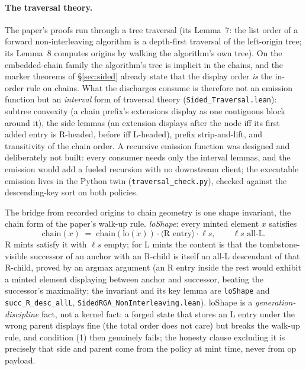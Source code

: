 \documentclass[11pt]{article}
\newcommand{\lean}[1]{\texttt{#1}}
\newcommand{\code}[1]{\texttt{#1}}
\newcommand{\chain}{\mathrm{chain}}
\begin{document}
\paragraph{The traversal theory.} The paper's proofs run through a
tree traversal (its Lemma~7: the list order of a forward
non-interleaving algorithm is a depth-first traversal of the
left-origin tree; its Lemma~8 computes origins by walking the
algorithm's own tree). On the embedded-chain family the algorithm's
tree is implicit in the chains, and the marker theorems of
\S\ref{sec:sided} already state that the display order \emph{is} the
in-order rule on chains. What the discharges consume is therefore not
an emission function but an \emph{interval} form of traversal theory
(\code{Sided\_Traversal.lean}): subtree convexity (a chain prefix's
extensions display as one contiguous block around it), the side lemmas
(an extension displays after the node iff its first added entry is
R-headed, before iff L-headed), prefix strip-and-lift, and transitivity
of the chain order. A recursive emission function was designed and
deliberately not built: every consumer needs only the interval lemmas,
and the emission would add a fueled recursion with no downstream
client; the executable emission lives in the Python twin
(\code{traversal\_check.py}), checked against the descending-key sort
on both policies.

The bridge from recorded origins to chain geometry is one shape
invariant, the chain form of the paper's walk-up rule.
\emph{loShape}: every minted element $x$ satisfies
\[
  \chain(x) \;=\; \chain(\mathrm{lo}(x)) \cdot \langle \text{R
  entry}\rangle \cdot \ell s, \qquad \ell s \text{ all-L}.
\]
R mints satisfy it with $\ell s$ empty; for L mints the content is that
the tombstone-visible successor of an anchor with an R-child is itself
an all-L descendant of that R-child, proved by an argmax argument (an R
entry inside the rest would exhibit a minted element displaying between
anchor and successor, beating the successor's maximality; the invariant
and its key lemma are \lean{loShape} and \lean{succ\_R\_desc\_allL},
\code{SidedRGA\_NonInterleaving.lean}). loShape is a
\emph{generation-discipline} fact, not a kernel fact: a forged state
that stores an L entry under the wrong parent displays fine (the total
order does not care) but breaks the walk-up rule, and condition (1)
then genuinely fails; the honesty clause excluding it is precisely that
side and parent come from the policy at mint time, never from op
payload.
\end{document}
